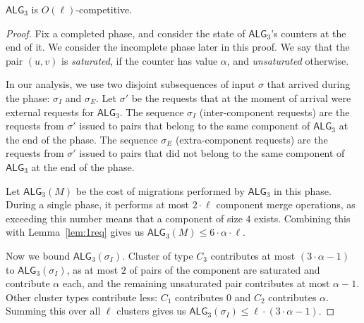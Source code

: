 \documentclass[manuscript,screen=true]{acmart}
\newcommand{\TAlg}{{\ensuremath{\textsf{ALG}_{3}}}\xspace} %
\newcommand\maciek[1]{\color{brown}\textbf{\\ Maciek: #1}\color{black}}
\begin{document}
\begin{theorem}
  \TAlg is $O(\ell)$-competitive.
\end{theorem}
\begin{proof}
  Fix a completed phase, and consider the state of \TAlg's counters at the end of it.
  We consider the incomplete phase later in this proof.
  We say that the pair $(u, v)$ is \emph{saturated}, if the counter has value $\alpha$, and \emph{unsaturated} otherwise.

  In our analysis, we use two disjoint subsequences of input $\sigma$ that arrived during the phase: $\sigma_I$ and $\sigma_E$.
  Let $\sigma'$ be the requests that at the moment of arrival were external requests for \TAlg.
  The sequence $\sigma_I$ (inter-component requests) are the requests from $\sigma'$ issued to pairs that belong to the same component of \TAlg at the end of the phase.
  The sequence $\sigma_E$ (extra-component requests) are the requests from $\sigma'$ issued to pairs that did not belong to the same component of \TAlg at the end of the phase.


  Let $\TAlg(M)$ be the cost of migrations performed by \TAlg in this phase.
  During a single phase, it performs at most $2\cdot \ell$ component merge operations, as
  exceeding this number means that a component of size $4$ exists.
  Combining this with Lemma~\ref{lem:1req} gives us $\TAlg(M) \leq 6\cdot\alpha\cdot\ell$.
  
  Now we bound $\TAlg(\sigma_I)$.
  Cluster of type $C_3$ contributes at most $(3\cdot \alpha - 1)$ to $\TAlg(\sigma_I)$, as at most $2$ of pairs of the component are saturated and contribute $\alpha$ each, and the remaining unsaturated pair contributes at most $\alpha-1$.
  Other cluster types contribute less: $C_1$ contributes $0$ and $C_2$ contributes $\alpha$.
  Summing this over all $\ell$ clusters gives us $\TAlg(\sigma_I) \leq \ell \cdot (3\cdot \alpha-1)$.



\end{proof}
\end{document}
